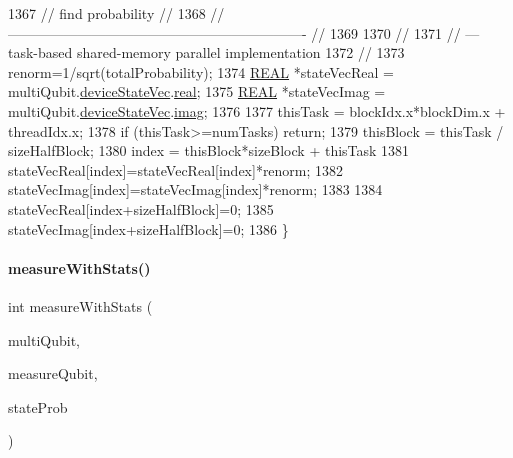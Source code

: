 \begin{DoxyCode}
1367     \textcolor{comment}{//            find probability                                      //}
1368     \textcolor{comment}{// ---------------------------------------------------------------- //}
1369 
1370     \textcolor{comment}{//}
1371     \textcolor{comment}{// --- task-based shared-memory parallel implementation}
1372     \textcolor{comment}{//}
1373     renorm=1/sqrt(totalProbability);
1374     \mbox{\hyperlink{QuEST__precision_8h_a4b654506f18b8bfd61ad2a29a7e38c25}{REAL}} *stateVecReal = multiQubit.\mbox{\hyperlink{structMultiQubit_a59ac613486a41b8c9a4b6e79cc8d2cc3}{deviceStateVec}}.\mbox{\hyperlink{structComplexArray_a4195cac6c784ea1b6271f1c7dba1548a}{real}};
1375     \mbox{\hyperlink{QuEST__precision_8h_a4b654506f18b8bfd61ad2a29a7e38c25}{REAL}} *stateVecImag = multiQubit.\mbox{\hyperlink{structMultiQubit_a59ac613486a41b8c9a4b6e79cc8d2cc3}{deviceStateVec}}.\mbox{\hyperlink{structComplexArray_a79dde47c7ae530c79cebfdf57b225968}{imag}};
1376 
1377     thisTask = blockIdx.x*blockDim.x + threadIdx.x;
1378     \textcolor{keywordflow}{if} (thisTask>=numTasks) \textcolor{keywordflow}{return};
1379     thisBlock = thisTask / sizeHalfBlock;
1380     index     = thisBlock*sizeBlock + thisTask%
1381     stateVecReal[index]=stateVecReal[index]*renorm;
1382     stateVecImag[index]=stateVecImag[index]*renorm;
1383 
1384     stateVecReal[index+sizeHalfBlock]=0;
1385     stateVecImag[index+sizeHalfBlock]=0;
1386 \}
\end{DoxyCode}
\mbox{\label{QuEST__env__localGPU_8cu_a2ac46e470c750bf93c754e06c64b0a7a}} 
\paragraph{\texorpdfstring{measure\+With\+Stats()}{measureWithStats()}}
{\footnotesize\ttfamily int measure\+With\+Stats (\begin{DoxyParamCaption}\item[{\mbox{\hyperlink{structMultiQubit}{Multi\+Qubit}}}]{multi\+Qubit,  }\item[{int}]{measure\+Qubit,  }\item[{\mbox{\hyperlink{QuEST__precision_8h_a4b654506f18b8bfd61ad2a29a7e38c25}{R\+E\+AL}} $\ast$}]{state\+Prob }\end{DoxyParamCaption})}



